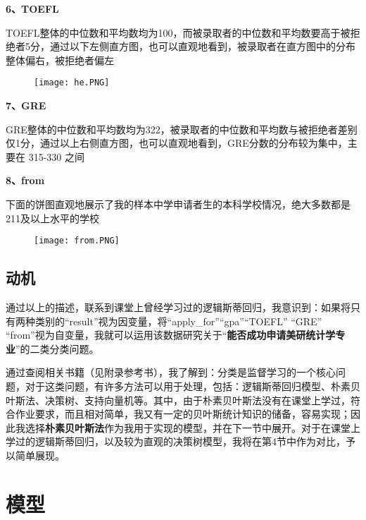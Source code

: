 \documentclass[UTF8,cs4size]{ctexart}
\begin{document}
\vspace{-2ex}
\par\noindent \textbf{6、TOEFL}
\par TOEFL整体的中位数和平均数均为100，而被录取者的中位数和平均数要高于被拒绝者5分，通过以下左侧直方图，也可以直观地看到，被录取者在直方图中的分布整体偏右，被拒绝者偏左
\begin{figure}[H]
	\centering
	\texttt{[image: he.PNG]}
\end{figure}



\par\noindent \textbf{7、GRE}
\par GRE整体的中位数和平均数均为322，被录取者的中位数和平均数与被拒绝者差别仅1分，通过以上右侧直方图，也可以直观地看到，GRE分数的分布较为集中，主要在 315-330 之间


\par\noindent \textbf{8、from}
\par 下面的饼图直观地展示了我的样本中学申请者生的本科学校情况，绝大多数都是211及以上水平的学校
\begin{figure}[h]
	\centering
	\texttt{[image: from.PNG]}
\end{figure}

\subsection{\heiti 动机}
\par 通过以上的描述，联系到课堂上曾经学习过的逻辑斯蒂回归，我意识到：如果将只有两种类别的“result”视为因变量，将“apply\_for”“gpa”“TOEFL” “GRE” “from”视为自变量，我就可以运用该数据研究关于“\textbf{能否成功申请美研统计学专业}”的二类分类问题。
\par 通过查阅相关书籍（见附录\quad 参考书），我了解到：分类是监督学习的一个核心问题，对于这类问题，有许多方法可以用于处理，包括：逻辑斯蒂回归模型、朴素贝叶斯法、决策树、支持向量机等。其中，由于朴素贝叶斯法没有在课堂上学过，符合作业要求，而且相对简单，我又有一定的贝叶斯统计知识的储备，容易实现；因此我选择\textbf{朴素贝叶斯法}作为我用于实现的模型，并在下一节中展开。对于在课堂上学过的逻辑斯蒂回归，以及较为直观的决策树模型，我将在第4节中作为对比，予以简单展现。


\section{\heiti 模型}
\end{document}
